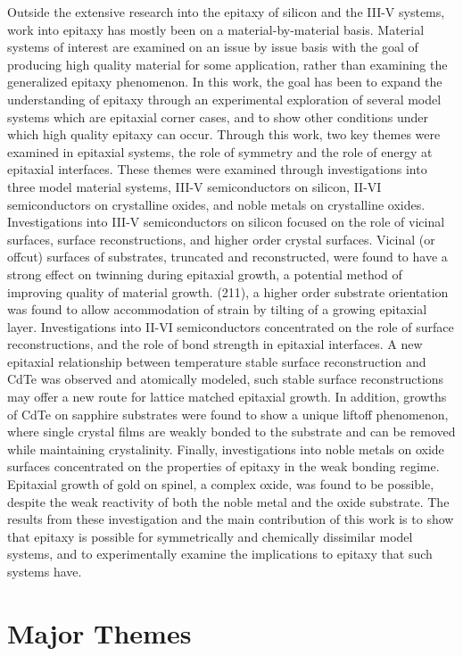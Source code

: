 Outside the extensive research into the epitaxy of silicon and the III-V systems, work into epitaxy has mostly been on a material-by-material basis.
Material systems of interest are examined on an issue by issue basis with the goal of producing high quality material for some application, rather than examining the generalized epitaxy phenomenon.
In this work, the goal has been to expand the understanding of epitaxy through an experimental exploration of several model systems which are epitaxial corner cases, and to show other conditions under which high quality epitaxy can occur.
Through this work, two key themes were examined in epitaxial systems, the role of symmetry and the role of energy at epitaxial interfaces.
These themes were examined through investigations into three model material systems, III-V semiconductors on silicon, II-VI semiconductors on crystalline oxides, and noble metals on crystalline oxides.
Investigations into III-V semiconductors on silicon focused on the role of vicinal surfaces, surface reconstructions, and higher order crystal surfaces.
Vicinal (or offcut) surfaces of substrates, truncated and reconstructed, were found to have a strong effect on twinning during epitaxial growth, a potential method of improving quality of material growth.
(211), a higher order substrate orientation was found to allow accommodation of strain by tilting of a growing epitaxial layer.
Investigations into II-VI semiconductors concentrated on the role of surface reconstructions, and the role of bond strength in epitaxial interfaces.
A new epitaxial relationship between temperature stable surface reconstruction and CdTe was observed and atomically modeled, such stable surface reconstructions may offer a new route for lattice matched epitaxial growth.
In addition, growths of CdTe on sapphire substrates were found to show a unique liftoff phenomenon, where single crystal films are weakly bonded to the substrate and can be removed while maintaining crystalinity.
Finally, investigations into noble metals on oxide surfaces concentrated on the properties of epitaxy in the weak bonding regime.
Epitaxial growth of gold on spinel, a complex oxide, was found to be possible, despite the weak reactivity of both the noble metal and the oxide substrate.
The results from these investigation and the main contribution of this work is to show that epitaxy is possible for symmetrically and chemically dissimilar model systems, and to experimentally examine the implications to epitaxy that such systems have.

\section{Major Themes}
